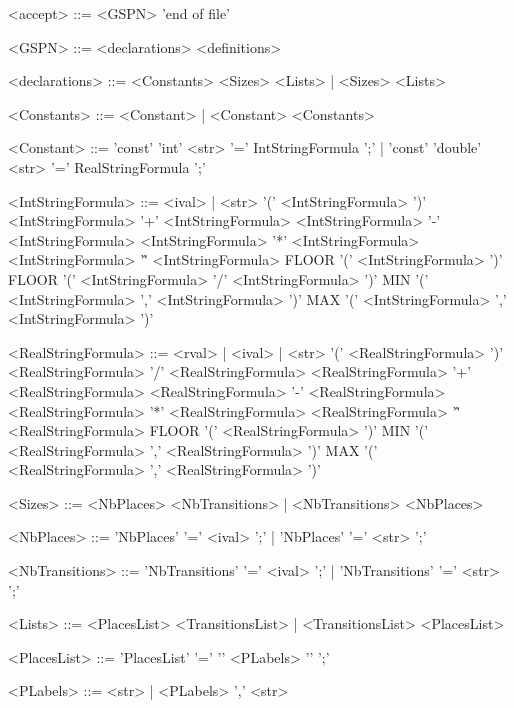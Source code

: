 \documentclass{article}
\begin{document}
\begin{scriptsize}
\begin{grammar}
<accept> ::= <GSPN> 'end of file'

<GSPN> ::= <declarations> <definitions>
 
<declarations> ::= <Constants> <Sizes> <Lists>
            | <Sizes> <Lists>

<Constants> ::= <Constant>
         | <Constant> <Constants>

<Constant> ::= 'const' 'int' <str> '=' IntStringFormula ';'
        | 'const' 'double' <str> '=' RealStringFormula ';'

<IntStringFormula> ::= <ival> | <str>
                \alt '(' <IntStringFormula> ')'
                \alt <IntStringFormula> '+' <IntStringFormula>
                \alt <IntStringFormula> '-' <IntStringFormula>
                \alt <IntStringFormula> '*' <IntStringFormula>
                \alt <IntStringFormula> '\^' <IntStringFormula>
                \alt FLOOR '(' <IntStringFormula> ')'
                \alt FLOOR '(' <IntStringFormula> '/' <IntStringFormula> ')'
                \alt MIN '(' <IntStringFormula> ',' <IntStringFormula> ')'
                \alt MAX '(' <IntStringFormula> ',' <IntStringFormula> ')'

<RealStringFormula> ::= <rval> | <ival> | <str>
                 \alt '(' <RealStringFormula> ')'
                 \alt <RealStringFormula> '/' <RealStringFormula>
                 \alt <RealStringFormula> '+' <RealStringFormula>
                 \alt <RealStringFormula> '-' <RealStringFormula>
                 \alt <RealStringFormula> '*' <RealStringFormula>
                 \alt <RealStringFormula> '\^' <RealStringFormula>
                 \alt FLOOR '(' <RealStringFormula> ')'
                 \alt MIN '(' <RealStringFormula> ',' <RealStringFormula> ')'
                 \alt MAX '(' <RealStringFormula> ',' <RealStringFormula> ')'

<Sizes> ::= <NbPlaces> <NbTransitions>
     | <NbTransitions> <NbPlaces>

<NbPlaces> ::= 'NbPlaces' '=' <ival> ';'
        | 'NbPlaces' '=' <str> ';'

<NbTransitions> ::= 'NbTransitions' '=' <ival> ';'
             | 'NbTransitions' '=' <str> ';'

<Lists> ::= <PlacesList> <TransitionsList>
     | <TransitionsList> <PlacesList>

<PlacesList> ::= 'PlacesList' '=' '{' <PLabels> '}' ';'

<PLabels> ::= <str>
       | <PLabels> ',' <str>


\end{grammar}
\end{scriptsize}
\end{document}

